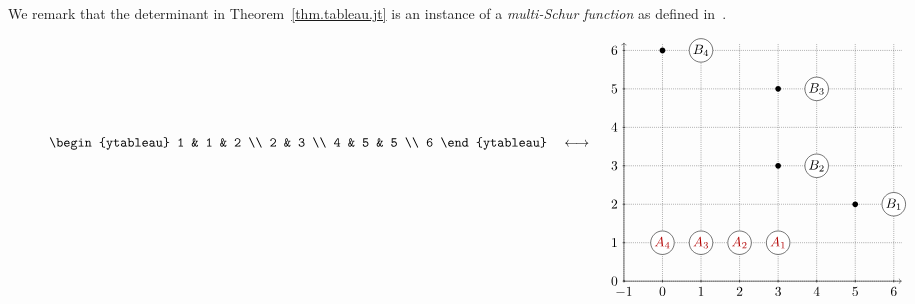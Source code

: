 \documentclass[reqno]{amsart}
\newcommand{\0}{\phantom{c}}
\newcommand{\defn}[1]{{\color{darkred}\emph{#1}}} %
\theoremstyle{plain}
\theoremstyle{definition}
\numberwithin{equation}{section}
\begin{document}
We remark that the determinant in Theorem~\ref{thm.tableau.jt} is an instance of a \defn{multi-Schur function} as defined in~\cite[(SCHUR.2.2)]{LLPT18}.


\begin{figure}[t]
\[
\begin{ytableau} 1 & 1 & 2 \\ 2 & 3 \\ 4 & 5 & 5 \\ 6 \end{ytableau}
\quad \longleftrightarrow \quad
\begin{tikzpicture}[baseline=3.5cm]
  \draw[densely dotted] (-1,0) grid (6.2,6.2);
  \draw[->] (-1,0) -- (-1,6.2);
  \draw[->] (-1,0) -- (6.2,0);
  \foreach \x/\xtext in {-1, 0, 1, 2, 3, 4, 5, 6}
     \draw (\x cm,1pt) -- (\x cm,-1pt) node[anchor=north] {$\xtext$};
  \foreach \y/\ytext in {0, 1, 2, 3, 4, 5, 6}
     \draw (-1cm+1pt,\y cm) -- (-1cm-1pt,\y cm) node[anchor=east] {$\ytext$};
  \foreach \x in {1, 2, 3, 4}
    \node[circle,fill=white,draw=black,text=darkred,inner sep=1pt] (A\x) at (4-\x,1) {$A_{\x}$};

  \node[circle,fill=white,draw=black,text=black,inner sep=1pt] (B4) at (1+4-4,6) {$B_4$};
  \node[circle,fill=black,inner sep=1.5pt] (B4p) at (1+4-4-1,6) {};
  \node[circle,fill=white,draw=black,text=black,inner sep=1pt] (B3) at (3+4-3,5) {$B_3$};
  \node[circle,fill=black,inner sep=1.5pt] (B3p) at (3+4-3-1,5) {};
  \node[circle,fill=white,draw=black,text=black,inner sep=1pt] (B2) at (2+4-2,3) {$B_2$};
  \node[circle,fill=black,inner sep=1.5pt] (B2p) at (2+4-2-1,3) {};
  \node[circle,fill=white,draw=black,text=black,inner sep=1pt] (B1) at (3+4-1,2) {$B_1$};
  \node[circle,fill=black,inner sep=1.5pt] (B1p) at (3+4-1-1,2) {};


\end{tikzpicture}\]
\end{figure}
\end{document}
